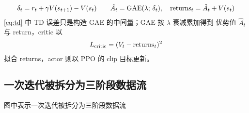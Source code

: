 \documentclass[UTF8,fontset=fandol]{ctexart}
\begin{document}
\begin{equation}\label{eq:td}
  \delta_t = r_t + \gamma V(s_{t+1}) - V(s_t)
  \qquad
  \hat{A}_t = \mathrm{GAE}(\lambda;\,\delta_t),\quad
  \text{returns}_t = \hat{A}_t + V(s_t)
\end{equation}
\cref{eq:td} 中 TD 误差只是构造 GAE 的中间量；GAE 按 $\lambda$ 衰减累加得到
优势值 $\hat{A}_t$ 与 return，critic 以
\begin{equation}\label{eq:valueloss}
  L_{\text{critic}} = (V_t - \text{returns}_t)^2
\end{equation}
拟合 returns，actor 则以 PPO 的 clip 目标更新。

\subsection{一次迭代被拆分为三阶段数据流}

图中表示一次迭代被拆分为三阶段数据流
\end{document}
